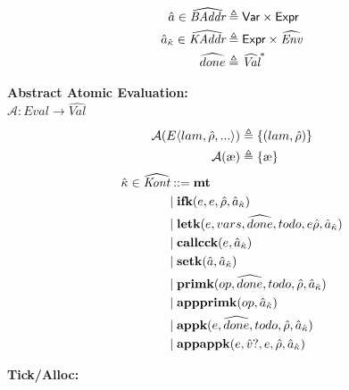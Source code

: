 \documentclass[12pt,draft]{article}
\newcommand\mae{\ensuremath{\text{\ae}}}
\begin{document}
\begin{multicols*}{2}
\begin{align*}
    \hat{a} \in \widehat{\textit{BAddr}}
    &\triangleq
      \textsf{Var} \times \textsf{Expr} \\
    \hat{a}_{\hat{\kappa}} \in \widehat{\textit{KAddr}}
    &\triangleq
      \textsf{Expr} \times \widehat{\textit{Env}} \\
    \widehat{done} &\triangleq \widehat{\textit{Val}}^*
                     \end{align*}
  \begin{center}
    \textbf{Abstract Atomic Evaluation:} \\
    $\mathcal{A} : \textit{Eval} \rightarrow \widehat{\textit{Val}}$
  \end{center}
  \vspace{-7mm}
  \begin{align*}
    \mathcal{A}(E\langle lam , \aenv , ... \rangle)
    &\triangleq \{ (lam , \aenv) \} \\
    \mathcal{A}(\mae)
    &\triangleq \{\mae\} \\
  \end{align*}
  \vfill\null
  \columnbreak
  \begin{align*}
    \hat{\kappa} \in \widehat{\textit{Kont}}
    &::= \textbf{mt} \\
    &|\; \textbf{ifk}(e, e, \hat{\rho}, \hat{a}_{\hat{\kappa}}) \\
    &|\; \textbf{letk}(e, vars, \widehat{done}, todo, e \hat{\rho}, \hat{a}_{\hat{\kappa}}) \\
    &|\; \textbf{callcck}(e, \hat{a}_{\hat{\kappa}}) \\
    &|\; \textbf{setk}(\hat{a}, \hat{a}_{\hat{\kappa}}) \\
    &|\; \textbf{primk}(op, \widehat{done}, todo, \hat{\rho}, \hat{a}_{\hat{\kappa}}) \\
    &|\; \textbf{appprimk}(op, \hat{a}_{\hat{\kappa}}) \\
    &|\; \textbf{appk}(e, \widehat{done}, todo, \hat{\rho}, \hat{a}_{\hat{\kappa}}) \\
    &|\; \textbf{appappk}(e, \hat{v}?, e, \hat{\rho}, \hat{a}_{\hat{\kappa}}) \\
  \end{align*}
  \begin{center}
    \textbf{Tick/Alloc:}
  \end{center}
  \vspace{-7mm}

\end{multicols*}
\end{document}
